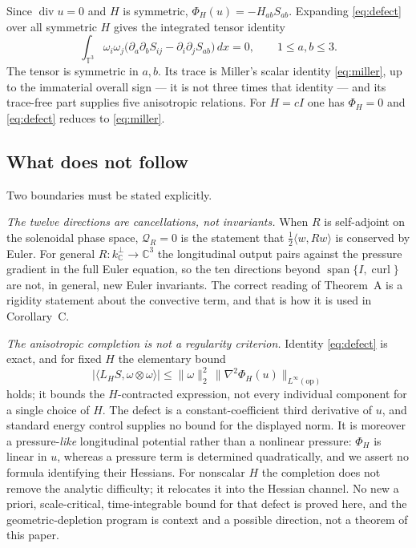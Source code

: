 \documentclass[11pt]{article}
\theoremstyle{definition}
\theoremstyle{remark}
\theoremstyle{plain}
\DeclareMathOperator{\curl}{curl}
\DeclareMathOperator{\dv}{div}
\DeclareMathOperator{\spn}{span}
\newcommand{\T}{\mathbb{T}}
\newcommand{\C}{\mathbb{C}}
\newcommand{\Qform}{\mathcal{Q}}
\newcommand{\kperp}{k_{\C}^{\perp}}
\begin{document}
Since $\dv u=0$ and $H$ is symmetric, $\Phi_{H}(u)=-H_{ab}S_{ab}$. Expanding
\eqref{eq:defect} over all symmetric $H$ gives the integrated tensor identity
\begin{equation}
\label{eq:tensoridentity}
\int_{\T^{3}}\omega_{i}\omega_{j}
\bigl(\partial_{a}\partial_{b}S_{ij}-\partial_{i}\partial_{j}S_{ab}\bigr)\,dx=0,
\qquad 1\le a,b\le3 .
\end{equation}
The tensor is symmetric in $a,b$. Its trace is Miller's scalar identity
\eqref{eq:miller}, up to the immaterial overall sign --- it is not three times
that identity --- and its trace-free part supplies five anisotropic relations.
For $H=cI$ one has $\Phi_{H}=0$ and \eqref{eq:defect} reduces to
\eqref{eq:miller}.

\subsection{What does not follow}
\label{subsec:not-invariants}

Two boundaries must be stated explicitly.

\emph{The twelve directions are cancellations, not invariants.} When $R$ is
self-adjoint on the solenoidal phase space, $\Qform_{R}=0$ is the statement
that $\tfrac12\langle w,Rw\rangle$ is conserved by Euler. For general
$R:\kperp\to\C^{3}$ the longitudinal output pairs against the pressure
gradient in the full Euler equation, so the ten directions beyond
$\spn\{I,\curl\}$ are not, in general, new Euler invariants. The correct
reading of Theorem~A is a rigidity statement about the convective term, and
that is how it is used in Corollary~C.

\emph{The anisotropic completion is not a regularity criterion.} Identity
\eqref{eq:defect} is exact, and for fixed $H$ the elementary bound
\[
|\langle L_{H}S,\omega\otimes\omega\rangle|
\le\|\omega\|_{2}^{2}\,\|\nabla^{2}\Phi_{H}(u)\|_{L^{\infty}(\mathrm{op})}
\]
holds; it bounds the $H$-contracted expression, not every individual component
for a single choice of $H$. The defect is a constant-coefficient third
derivative of $u$, and standard energy control supplies no bound for the
displayed norm. It is moreover a pressure-\emph{like} longitudinal potential
rather than a nonlinear pressure: $\Phi_{H}$ is linear in $u$, whereas a
pressure term is determined quadratically, and we assert no formula identifying
their Hessians. For nonscalar $H$ the completion does not remove the analytic
difficulty; it relocates it into the Hessian channel. No new a priori,
scale-critical, time-integrable bound for that defect is proved here, and
the geometric-depletion program is context and a possible direction, not a
theorem of this paper.
\end{document}
